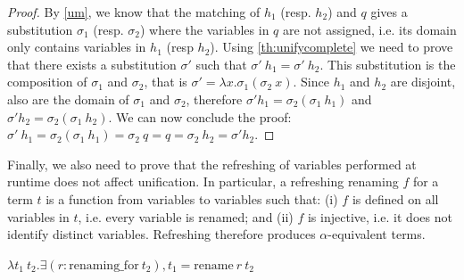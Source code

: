 \begin{proof}
  By \cref{um}, we know that the matching of $h_1$ (resp. $h_2$) and $q$ gives a
  substitution $\sigma_1$ (resp. $\sigma_2$) where the variables in $q$ are not
  assigned, i.e. its domain only contains variables in $h_1$ (resp $h_2$). Using
  \cref{th:unifycomplete} we need to prove that there exists a
  substitution $\sigma'$ such that $\sigma'\ h_1 = \sigma'\ h_2$. This
  substitution is the composition of $\sigma_1$ and $\sigma_2$, that is
  $\sigma' = \lambda x. \sigma_1 (\sigma_2\ x)$. Since $h_1$ and
  $h_2$ are disjoint, also are the domain of $\sigma_1$ and $\sigma_2$, therefore
  $\sigma' h_1 = \sigma_2 (\sigma_1\ h_1)$ and $\sigma' h_2 = \sigma_2 (\sigma_1\ h_2)$.
  We can now conclude the proof: $\sigma'\ h_1 = \sigma_2 (\sigma_1\ h_1) = \sigma_2\ q = q = \sigma_2\ h_2 = \sigma' h_2$.
\end{proof}


% 
% 

Finally, we also need to prove that the refreshing of variables
performed at runtime does not affect unification.
In particular, a refreshing renaming $f$ for a term $t$ is a function from
variables to variables such that: (i) $f$ is defined on all variables in
$t$, i.e. every variable is renamed; and (ii) $f$ is injective, i.e. it
does not identify distinct variables. Refreshing therefore produces
$\alpha$-equivalent terms.


% 


\begin{definition}[$=_\alpha$]
  $\lambda t_1\ t_2. \exists (r:\mathrm{renaming\_for}\ t_2), t_1 = \mathrm{rename}\ r\ t_2$
\end{definition}

